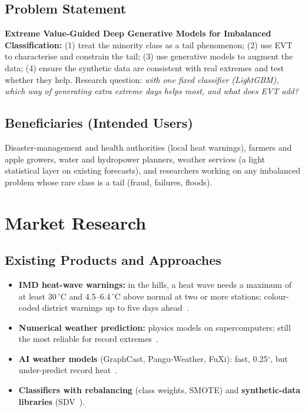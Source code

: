 \documentclass[12pt,a4paper]{report}
\begin{document}
\section{Problem Statement}
\textbf{Extreme Value-Guided Deep Generative Models for Imbalanced Classification:} (1) treat the minority class as a
tail phenomenon; (2) use EVT to characterise and constrain the tail; (3) use generative models to augment the data;
(4) ensure the synthetic data are consistent with real extremes and test whether they help. Research question:
\emph{with one fixed classifier (LightGBM), which way of generating extra extreme days helps most, and what does EVT
add?}

\section{Beneficiaries (Intended Users)}
Disaster-management and health authorities (local heat warnings), farmers and apple growers, water and hydropower
planners, weather services (a light statistical layer on existing forecasts), and researchers working on any
imbalanced problem whose rare class is a tail (fraud, failures, floods).

\chapter{Market Research}
\section{Existing Products and Approaches}
\begin{itemize}
  \item \textbf{IMD heat-wave warnings:} in the hills, a heat wave needs a maximum of at least 30\,$^\circ$C and
        4.5--6.4\,$^\circ$C above normal at two or more stations; colour-coded district warnings up to five days
        ahead~\cite{bhan_imd}.
  \item \textbf{Numerical weather prediction:} physics models on supercomputers; still the most reliable for record
        extremes~\cite{zhang2025records}.
  \item \textbf{AI weather models} (GraphCast, Pangu-Weather, FuXi): fast, 0.25$^\circ$, but under-predict record
        heat~\cite{zhang2025records,lopezgomez2023heat}.
  \item \textbf{Classifiers with rebalancing} (class weights, SMOTE) and \textbf{synthetic-data libraries}
        (SDV~\cite{patki2016sdv}).
\end{itemize}
\end{document}
